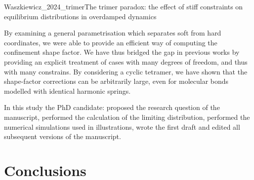\documentclass{doctoral}
\begin{document}
\begin{publicationpage}{Waszkiewicz_2024_trimer}{The trimer paradox: the effect of stiff constraints on equilibrium distributions in overdamped dynamics}
{        %
        By examining a general parametrisation which separates soft from hard coordinates, we were able to provide an efficient way of computing the confinement shape factor.
        We have thus bridged the gap in previous works by providing an explicit treatment of cases with many degrees of freedom, and thus with many constrains.
        By considering a cyclic tetramer, we have shown that the shape-factor corrections can be arbitrarily large, even for molecular bonds modelled with identical harmonic springs.

        In this study the PhD candidate: proposed the research question of the manuscript, performed the calculation of the limiting distribution, performed the numerical simulations used in illustrations, wrote the first draft and edited all subsequent versions of the manuscript.
    }
\end{publicationpage}


\chapter{Conclusions}
\end{document}
